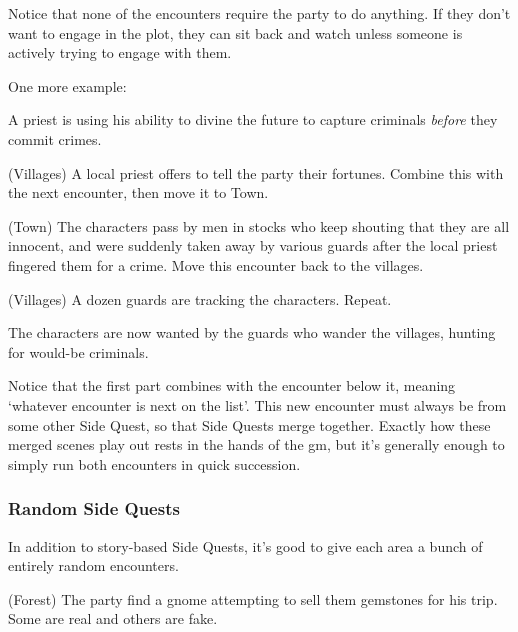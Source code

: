 \begin{multicols}{2}
Notice that none of the encounters require the party to do anything.
If they don't want to engage in the plot, they can sit back and watch unless someone is actively trying to engage with them.

One more example:

\begin{exampletext}

A priest is using his ability to divine the future to capture criminals \emph{before} they commit crimes.

\end{exampletext}

\begin{list}{\Square}{}

\item[\CheckedBox]{(Villages) A local priest offers to tell the party their fortunes.  Combine this with the next encounter, then move it to Town.}

\item{(Town) The characters pass by men in stocks who keep shouting that they are all innocent, and were suddenly taken away by various guards after the local priest fingered them for a crime.  Move this encounter back to the villages.}

\item{(Villages) A dozen guards are tracking the characters. Repeat.}

\end{list}

The characters are now wanted by the guards who wander the villages, hunting for would-be criminals.

Notice that the first part combines with the encounter below it, meaning `whatever encounter is next on the list'.
This new encounter must always be from some other Side Quest, so that Side Quests merge together.
Exactly how these merged scenes play out rests in the hands of the \gls{gm}, but it's generally enough to simply run both encounters in quick succession.

\subsubsection{Random Side Quests}

In addition to story-based Side Quests, it's good to give each area a bunch of entirely random encounters.

\begin{list}{\Square}{}

	\item{(Forest) The party find a gnome attempting to sell them gemstones for his trip. Some are real and others are fake.}


\end{list}
\end{multicols}
